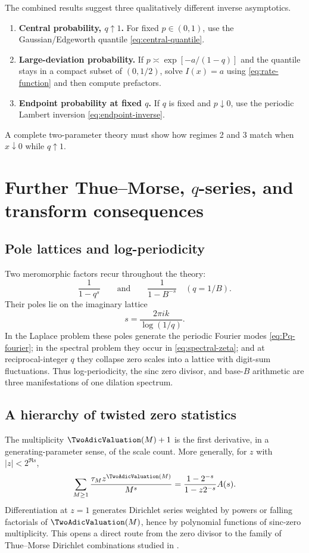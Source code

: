 \documentclass[11pt,oneside]{article}
\theoremstyle{definition}
\theoremstyle{remark}
\begin{document}
The combined results suggest three qualitatively different inverse asymptotics.
\begin{enumerate}
  \item \textbf{Central probability, $q\uparrow1$.}  For fixed $p\in(0,1)$, use the Gaussian/Edgeworth quantile \cref{eq:central-quantile}.
  \item \textbf{Large-deviation probability.}  If $p\asymp\exp[-a/(1-q)]$ and the quantile stays in a compact subset of $(0,1/2)$, solve $I(x)=a$ using \cref{eq:rate-function} and then compute prefactors.
  \item \textbf{Endpoint probability at fixed $q$.}  If $q$ is fixed and $p\downarrow0$, use the periodic Lambert inversion \cref{eq:endpoint-inverse}.
\end{enumerate}
A complete two-parameter theory must show how regimes 2 and 3 match when $x\downarrow0$ while $q\uparrow1$.

\section{Further Thue--Morse, $q$-series, and transform consequences}

\subsection{Pole lattices and log-periodicity}

Two meromorphic factors recur throughout the theory:
\[
 \frac1{1-q^s}
 \qquad\text{and}\qquad
 \frac1{1-B^{-s}}\quad(q=1/B).
\]
Their poles lie on the imaginary lattice
\[
 s=\frac{2\pi ik}{\log(1/q)}.
\]
In the Laplace problem these poles generate the periodic Fourier modes \cref{eq:Pq-fourier}; in the spectral problem they occur in \cref{eq:spectral-zeta}; and at reciprocal-integer $q$ they collapse zero scales into a lattice with digit-sum fluctuations.  Thus log-periodicity, the sinc zero divisor, and base-$B$ arithmetic are three manifestations of one dilation spectrum.

\subsection{A hierarchy of twisted zero statistics}

The multiplicity $\TwoAdicValuation(M)+1$ is the first derivative, in a generating-parameter sense, of the scale count.  More generally, for $z$ with $|z|<2^{\Re s}$,
\begin{equation}\label{eq:valuation-generating}
 \sum_{M\ge1}\frac{\tau_M z^{\TwoAdicValuation(M)}}{M^s}
 =\frac{1-2^{-s}}{1-z2^{-s}}A(s).
\end{equation}
Differentiation at $z=1$ generates Dirichlet series weighted by powers or falling factorials of $\TwoAdicValuation(M)$, hence by polynomial functions of sinc-zero multiplicity.  This opens a direct route from the zero divisor to the family of Thue--Morse Dirichlet combinations studied in \cite{toth}.
\end{document}

